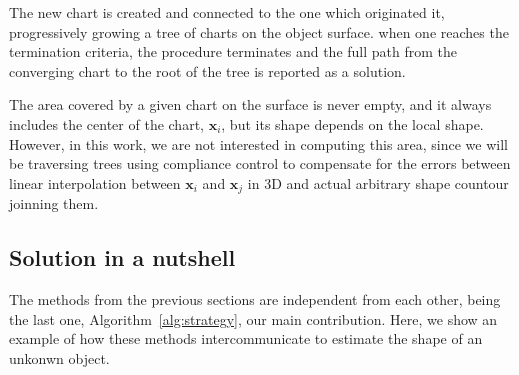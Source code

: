 The new chart is created and connected to the one which originated it, progressively
growing a tree of charts on the object surface.
when one reaches the termination criteria, the procedure terminates and the full
path from the converging chart to the root of the tree is reported as a solution.

The area covered by a given chart on the surface is never empty, and
it always includes the center of the chart, $\mathbf{x}_{i}$, but its shape 
depends on the local shape. However, in this work, we are not interested in computing this area, 
since we will be traversing trees using compliance control to compensate for the errors between 
linear interpolation between $\mathbf{x}_i$ and $\mathbf{x}_j$ in 3D and actual arbitrary 
shape countour joinning them.

\subsection{Solution in a nutshell}
\label{sec:summary}

The methods from the previous sections are independent from each other, being the last one, Algorithm~\ref{alg:strategy}, our main contribution. Here, we show an example of how these methods intercommunicate to estimate the shape of an unkonwn object.

